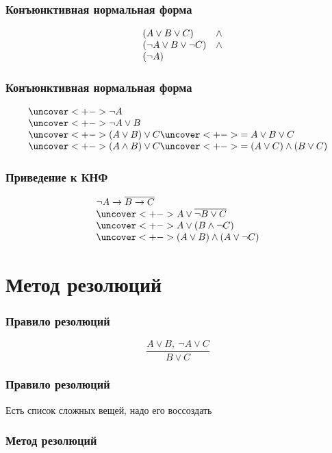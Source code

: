 \documentclass[24pt,pdf,hyperref={unicode}]{beamer}
\begin{document}
\begin{frame}\frametitle{Конъюнктивная нормальная форма}

$$
\begin{array}{l l l}
& (A \vee B \vee C) & \wedge \\
& (\neg A \vee B \vee \neg C) & \wedge \\
& (\neg A)
\end{array}
$$
\end{frame}

\begin{frame}\frametitle{Конъюнктивная нормальная форма}
$$
\begin{array}{l}
\uncover<+->{ \neg A } \\
\uncover<+->{ \neg A \vee B } \\
\uncover<+->{ (A \vee B) \vee C } \uncover<+->{ = A\vee B\vee C }\\
\uncover<+->{ (A \wedge B) \vee C } \uncover<+->{ = (A\vee C)\wedge (B\vee C)}\\
\end{array}
$$
\end{frame}

\begin{frame}\frametitle{Приведение к КНФ}
$$
\begin{array}{l}
\neg A\rightarrow \overline{B\rightarrow C} \\
\uncover<+->{ A \vee \overline{\neg B \vee C }} \\
\uncover<+->{ A \vee (B \wedge \neg C) } \\
\uncover<+->{ (A\vee B) \wedge (A \vee \neg C) }
\end{array}
$$
\end{frame}

\section{Метод резолюций}

\begin{frame}\frametitle{Правило резолюций}
{\huge
$$
\frac{A\vee B,\ \neg A \vee C}{B \vee C}
$$
}
\end{frame}

\begin{frame}\frametitle{Правило резолюций}
Есть список сложных вещей, надо его воссоздать
\end{frame}

\begin{frame}\frametitle{Метод резолюций}
 
\end{frame}
\end{document}
